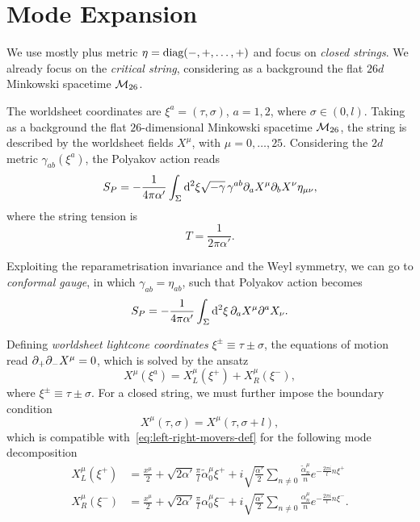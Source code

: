 \section{Mode Expansion}
We use mostly plus metric $\eta = \textup{diag}(-,+,\dots,+)$ and focus on \emph{closed strings}. We already focus on the \emph{critical string}, considering as a background the flat $26d$ Minkowski spacetime $\mathcal{M}_{26}$.

The worldsheet coordinates are $\xi^a = (\tau, \sigma)$, $a= 1,2$, where $\sigma \in (0,l)$. Taking as a background the flat $26$-dimensional Minkowski spacetime $\mathcal{M}_{26}$, the string is described by the worldsheet fields $X^{{\mu}}$, with ${\mu} = 0, \dots, 25$. Considering the $2d$ metric $\gamma_{ab}(\xi^a)$, the Polyakov action reads
\begin{equation}
    S_P= -\frac{1}{4\pi\alpha'} \int_\Sigma \mathop{}\!\mathrm{d}^2 \xi \sqrt{-\gamma} \, \gamma^{ab} \partial_a X^{{\mu}} \partial_b X^{{\nu}} \eta_{{\mu}{\nu}} ,
\end{equation}
where the string tension is
\begin{equation}
    T = \frac{1}{2\pi\alpha'} .
\end{equation}

Exploiting the reparametrisation invariance and the Weyl symmetry, we can go to \emph{conformal gauge}, in which $\gamma_{ab} = \eta_{ab}$, such that Polyakov action becomes
\begin{equation}\label{eq:polyakov-conformal-gauge}
    S_P= -\frac{1}{4\pi\alpha'} \int_\Sigma \mathop{}\!\mathrm{d}^2 \xi \, \partial_a X^{{\mu}} \partial^a X_{{\nu}}  .
\end{equation}

Defining \emph{worldsheet lightcone coordinates} $\xi^\pm \equiv \tau \pm \sigma$, the equations of motion read $\partial_+\partial_- X^\mu = 0$, which is solved by the ansatz
\begin{equation}\label{eq:left-right-movers-def}
    X^{{\mu}}(\xi^a) = X^{{\mu}}_L(\xi^+) + X^{{\mu}}_R(\xi^-) ,
\end{equation}
where $\xi^\pm \equiv \tau \pm \sigma$. For a closed string, we must further impose the boundary condition
\begin{equation}\label{eq:boundary-condition}
    X^\mu (\tau,\sigma) = X^\mu (\tau, \sigma + l),
\end{equation}
which is compatible with~\eqref{eq:left-right-movers-def} for the following mode decomposition
\begin{subequations}\label{eq:mode-expansion}
\begin{align}
    X^\mu_L(\xi^+) &= \frac{x^\mu}{2} + \sqrt{2\alpha'} \frac{\pi}{l} \tilde{\alpha}^\mu_0 \xi^+ + i \sqrt{\frac{\alpha'}{2}} \sum_{n\neq 0} \frac{\tilde{\alpha}^\mu_n}{n}e^{-\frac{2\pi i}{l}n \xi^+} \\
    X^\mu_R(\xi^-) &= \frac{x^\mu}{2} + \sqrt{2\alpha'} \frac{\pi}{l} {\alpha}^\mu_0 \xi^- + i \sqrt{\frac{\alpha'}{2}} \sum_{n\neq 0} \frac{{\alpha}^\mu_n}{n}e^{-\frac{2\pi i}{l}n \xi^-} .
\end{align}
\end{subequations}

